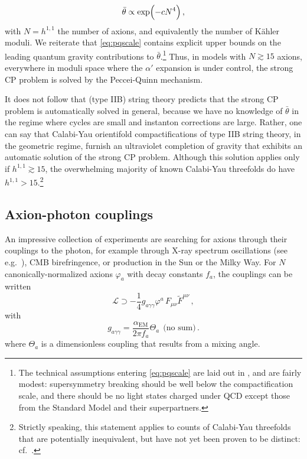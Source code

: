 \documentclass[12pt,a4wide]{article}
\begin{document}
\begin{equation}\label{eq:pqscale}
    \bar{\theta} \propto \text{exp}\Bigl( - c N^4 \Bigr)\,,
\end{equation} with $N = h^{1,1}$ the number of axions, and equivalently the number of K\"ahler moduli.  
We reiterate that \eqref{eq:pqscale} contains explicit upper bounds on the leading quantum gravity contributions to $\bar{\theta}$.\footnote{The technical assumptions entering \eqref{eq:pqscale} are laid out in \cite{Demirtas:2021gsq}, and are fairly modest: supersymmetry breaking should be well below the compactification scale, and there should be no light states charged under QCD except those from the Standard Model and their superpartners.}
Thus, in models with $N \gtrsim 15$ axions, everywhere in moduli space where the $\alpha'$ expansion is under control, the strong CP problem is solved by the Peccei-Quinn mechanism.

It does not follow that (type IIB) string theory predicts that the strong CP problem is automatically solved in general, because we have no knowledge of $\bar{\theta}$ in the regime where cycles are small and instanton corrections are large.  Rather, one can say that Calabi-Yau orientifold compactifications of type IIB string theory, in the geometric regime, furnish an ultraviolet completion of gravity that exhibits an automatic solution of the strong CP problem.  Although this solution applies only if $h^{1,1} \gtrsim 15$, the overwhelming majority of known Calabi-Yau threefolds do have $h^{1,1} > 15$.\footnote{Strictly speaking, this statement applies to counts of Calabi-Yau threefolds
that are potentially inequivalent, but have not yet been proven to be distinct: cf.~\cite{Gendler:2023ujl}.}


\subsection{Axion-photon couplings}

An impressive collection of experiments are searching for axions through their couplings to the photon, for example through X-ray spectrum oscillations (see e.g.~\cite{Marsh:2017yvc,Reynolds:2019uqt,Reynes:2021bpe}), CMB birefringence, or production in the Sun or the Milky Way.
For $N$ canonically-normalized axions $\varphi_a$ with decay constants $f_a$, the couplings can be written
\begin{equation}
    \mathcal{L} \supset -\frac{1}{4}g_{a\gamma\gamma} \varphi^a\,F_{\mu\nu}\tilde{F}^{\mu\nu}\,,
\end{equation}
with
\begin{equation}
    g_{a\gamma\gamma} = \frac{\alpha_{\text{EM}}}{2\pi f_a}\Theta_a~~\text{(no sum)}\,.
\end{equation} where $\Theta_a$ is a dimensionless coupling that results from a mixing angle.
\end{document}

